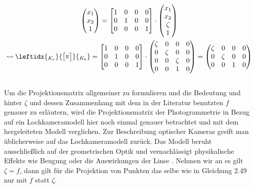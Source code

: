 		\begin{gather}
		\begin{pmatrix}
		x_1\\x_2\\1
		\end{pmatrix} 
		=
		\begin{bmatrix}
		1&0&0&0\\
		0&1&0&0\\
		0&0&0&1\\
		\end{bmatrix} \cdot
		\begin{pmatrix}
		x_1\\x_2\\\zeta\\1
		\end{pmatrix}\\
		\leadsto 	
		\leftidx{_{K_{c}}}{\begin{bmatrix}
			\pi
			\end{bmatrix}}{_{K_{b}}} 
		= 	\begin{bmatrix}
		1&0&0&0\\
		0&1&0&0\\
		0&0&0&1\\
		\end{bmatrix} \cdot
		\begin{pmatrix}
		\zeta&0&0&0\\
		0&\zeta&0&0\\
		0&0&\zeta&0\\
		0&0&1&0
		\end{pmatrix} 
		=
		\begin{pmatrix}
		\zeta&0&0&0\\
		0&\zeta&0&0\\
		0&0&1&0\\
		\end{pmatrix}
		\end{gather}\\
		
		Um die Projektionsmatrix allgemeiner zu formulieren und die Bedeutung und hinter $\zeta$ und dessen Zusammenhang mit dem in der Literatur benutzten $f$ genauer zu erläutern, wird die Projektionsmatrix der Photogrammetrie in Bezug auf ein Lochkameramodell\cite{HZ} hier noch einmal genauer betrachtet und mit dem hergeleiteten Modell verglichen. Zur Beschreibung optischer Kameras greift man üblicherweise auf das Lochkameramodell zurück. Das Modell beruht ausschließlich auf der geometrischen Optik und vernachlässigt physikalische Effekte wie Beugung oder die Auswirkungen der Linse \cite{Heipke}.  Nehmen wir an es gilt $\zeta = f$, dann gilt für die Projektion von Punkten das selbe wie in Gleichung 2.49 nur mit $f$ statt $\zeta$. 
		
